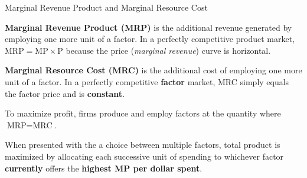 \documentclass[10pt]{article}
\begin{document}
  \begin{core}{Marginal Revenue Product and Marginal Resource Cost}

    \textbf{Marginal Revenue Product (MRP)} is the additional revenue generated by employing one more unit of a factor. In a perfectly competitive product market, $\text{MRP} = \text{MP} \times \text{P}$ because the price (\textit{marginal revenue}) curve is horizontal.

    \textbf{Marginal Resource Cost (MRC)} is the additional cost of employing one more unit of a factor. In a perfectly competitive \textbf{factor} market, MRC simply equals the factor price and is \textbf{constant}.

    To maximize profit, firms produce and employ factors at the quantity where $\text{MRP} = \text{MRC}$.


    When presented with the a choice between multiple factors, total product is maximized by allocating each successive unit of spending to whichever factor \textbf{currently} offers the \textbf{highest MP per dollar spent}.

  \end{core}
\end{document}
